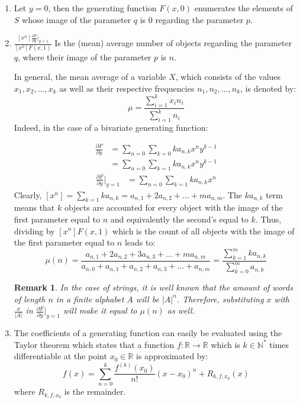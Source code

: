 \documentclass[12pt]{report}
\newtheorem*{remark}{Remark}
\begin{document}
{\begin{enumerate}[label=\roman{*})]
\item Let $y=0$, then the generating function $F(x,0)$ enumerates the elements of $S$ whose image of the parameter $q$ is $0$ regarding the parameter $p$. 

\item $\frac{[x^n] \frac{\partial F}{ \partial y} \big\vert_{y=1}}{[x^n]F(x,1)}$ Is the (mean) average number of objects regarding the parameter $q$, where their image of the parameter $p$ is $n$.

In general, the mean average of a variable $X$, which consists of the values $x_1,x_2,\ldots,x_k$ as well as their respective frequencies $n_1, n_2,\ldots,n_k$, is denoted by: \[\mu = \frac{\sum\limits_{i=1}^k x_i n_i}{\sum\limits_{i=1}^k n_i}\] 
Indeed, in the case of a bivariate generating function:

\begin{align*}
\frac{\partial F}{ \partial y}
	&= \sum\limits_{n=0}\sum\limits_{k=0} k a_{n,k} x^n y^{k-1} \\
	&= \sum\limits_{n=0}\sum\limits_{k=1} k a_{n,k} x^n y^{k-1}
\end{align*}
\begin{align*}
\frac{\partial F}{ \partial y} \bigg\vert_{y=1}
&= \sum\limits_{n=0}\sum\limits_{k=1} k a_{n,k} x^n
\end{align*}
Clearly, $[x^n]=\sum\limits_{k=1} k a_{n,k}= a_{n,1} + 2a_{n,2} + \ldots + m a_{n,m}$. The $k a_{n,k}$ term means that $k$ objects are accounted for every object with the image of the first parameter equal to $n$ and equivalently the second's equal to $k$. Thus, dividing by $[x^n] F(x,1)$ which is the count of all objects with the image of the first parameter equal to $n$ leads to: \[\mu(n)=\frac{a_{n,1} + 2a_{n,2}+3a_{n,3} + \ldots + m a_{n,m}}{a_{n,0}+a_{n,1} + a_{n,2}+a_{n,3} + \ldots + a_{n,m}}=\frac{\sum\limits_{k=1}^m k a_{n,k}}{\sum\limits_{k=0}^m a_{n,k}}\]

\begin{remark} In the case of strings, it is well known that the amount of words of length $n$ in a finite alphabet $A$ will be $|A|^n$. Therefore, substituting $x$ with $\frac{x}{|A|}$ in $ \frac{\partial F}{ \partial y} \vert_{y=1}$ will make it equal to $\mu(n)$ as well.
\end{remark}

\item The coefficients of a generating function can easily be evaluated using the Taylor theorem which states that a function $f: \mathbb{R} \rightarrow \mathbb{R}$ which is $k \in \mathbb{N^*}$ times differentiable at the point $x_0 \in \mathbb{R}$ is approximated by:
\[f(x)=\sum\limits_{n=0}^k \frac{f^{(k)}(x_0)}{n!}(x-x_0)^n + R_{k,f,x_0}(x)\]
where $R_{k,f,x_0}$ is the remainder.
\end{enumerate}

}
\end{document}
